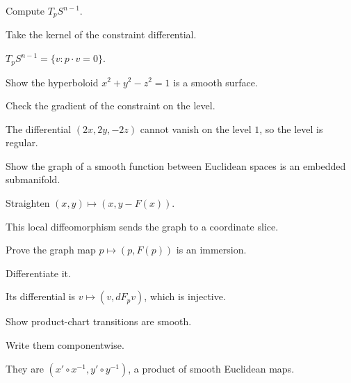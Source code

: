 \begin{exercise}\label{exr:vii06-10}
Compute \(T_pS^{n-1}\).
\end{exercise}
\begin{hint}
Take the kernel of the constraint differential.
\end{hint}
\begin{solution}
\(T_pS^{n-1}=\{v:p\cdot v=0\}\).
\end{solution}

\begin{exercise}\label{exr:vii06-11}
Show the hyperboloid \(x^2+y^2-z^2=1\) is a smooth surface.
\end{exercise}
\begin{hint}
Check the gradient of the constraint on the level.
\end{hint}
\begin{solution}
The differential \((2x,2y,-2z)\) cannot vanish on the level \(1\), so the level is regular.
\end{solution}

\begin{exercise}\label{exr:vii06-12}
Show the graph of a smooth function between Euclidean spaces is an embedded submanifold.
\end{exercise}
\begin{hint}
Straighten \((x,y)\mapsto(x,y-F(x))\).
\end{hint}
\begin{solution}
This local diffeomorphism sends the graph to a coordinate slice.
\end{solution}

\begin{exercise}\label{exr:vii06-13}
Prove the graph map \(p\mapsto(p,F(p))\) is an immersion.
\end{exercise}
\begin{hint}
Differentiate it.
\end{hint}
\begin{solution}
Its differential is \(v\mapsto(v,dF_pv)\), which is injective.
\end{solution}

\begin{exercise}\label{exr:vii06-14}
Show product-chart transitions are smooth.
\end{exercise}
\begin{hint}
Write them componentwise.
\end{hint}
\begin{solution}
They are \((x'\circ x^{-1},y'\circ y^{-1})\), a product of smooth Euclidean maps.
\end{solution}

